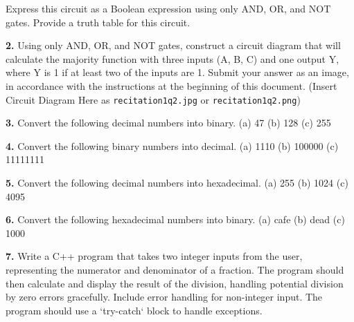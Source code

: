 \documentclass{article}
\begin{document}
Express this circuit as a Boolean expression using only AND, OR, and NOT gates. Provide a truth table for this circuit.

\noindent\textbf{2.} Using only AND, OR, and NOT gates, construct a circuit diagram that will calculate the majority function with three inputs (A, B, C) and one output Y, where Y is 1 if at least two of the inputs are 1. Submit your answer as an image, in accordance with the instructions at the beginning of this document.  (Insert Circuit Diagram Here as \texttt{recitation1q2.jpg} or \texttt{recitation1q2.png})

\noindent\textbf{3.} Convert the following decimal numbers into binary.
(a) 47
(b) 128
(c) 255

\noindent\textbf{4.} Convert the following binary numbers into decimal.
(a) 1110
(b) 100000
(c) 11111111

\noindent\textbf{5.} Convert the following decimal numbers into hexadecimal.
(a) 255
(b) 1024
(c) 4095

\noindent\textbf{6.} Convert the following hexadecimal numbers into binary.
(a) cafe
(b) dead
(c) 1000

\noindent\textbf{7.}  Write a C++ program that takes two integer inputs from the user, representing the numerator and denominator of a fraction.  The program should then calculate and display the result of the division, handling potential division by zero errors gracefully.  Include error handling for non-integer input. The program should use a `try-catch` block to handle exceptions.
\end{document}
